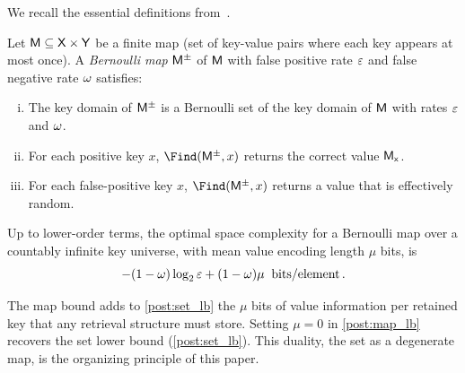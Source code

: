 We recall the essential definitions from~\cite{bernoulli_maps}.

\begin{definition}
\label{def:bernoulli_map}
Let $\Set{M} \subseteq \Set{X} \times \Set{Y}$ be a finite map (set of
key-value pairs where each key appears at most once).
A \emph{Bernoulli map} $\ASet{M}$ of $\Set{M}$ with false positive rate
$\fprate$ and false negative rate $\fnrate$ satisfies:
\begin{enumerate}[(i)]
    \item The key domain of $\ASet{M}$ is a Bernoulli set of the key domain
    of $\Set{M}$ with rates $\fprate$ and $\fnrate$.
    \item For each positive key $x$, $\Find(\ASet{M}, x)$ returns the correct
    value $\Set{M}[x]$.
    \item For each false-positive key $x$, $\Find(\ASet{M}, x)$ returns a
    value that is effectively random.
\end{enumerate}
\end{definition}

\begin{theorem}
\label{post:map_lb}
Up to lower-order terms, the optimal space complexity for a Bernoulli map over
a countably infinite key universe, with mean value encoding length $\mu$ bits,
is
\begin{equation}
    -(1 - \fnrate) \log_2 \fprate + (1-\fnrate)\mu \;\; \si{bits \per element}\,.
\end{equation}
\end{theorem}

\begin{remark}
The map bound adds to \cref{post:set_lb} the $\mu$ bits of value information
per retained key that any retrieval structure must store.
Setting $\mu = 0$ in \cref{post:map_lb} recovers the set lower bound
(\cref{post:set_lb}).
This duality, the set as a degenerate map, is the organizing principle of
this paper.
\end{remark}
